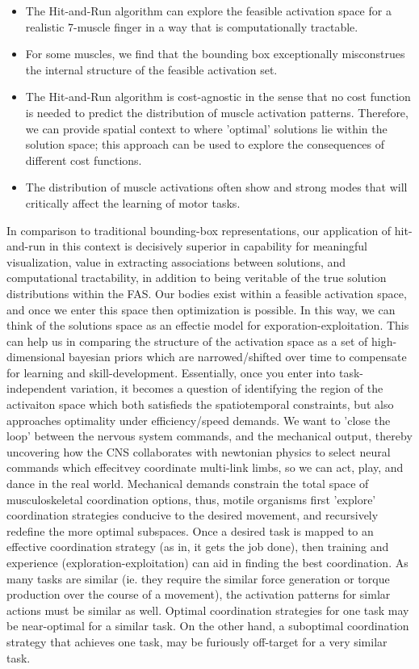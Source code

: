 \begin{itemize}
	\item{The Hit-and-Run algorithm can explore the feasible activation space for a realistic 7-muscle finger in a way that is computationally tractable.}
	\item{For some muscles, we find that the bounding box exceptionally misconstrues the internal structure of the feasible activation set.}
	\item{The Hit-and-Run algorithm is cost-agnostic in the sense that no cost function is needed to predict the distribution of muscle activation patterns. Therefore, we can provide spatial context to where 'optimal' solutions lie within the solution space; this approach can be used to explore the consequences of different cost functions.}
	\item{The distribution of muscle activations often show and strong modes that will critically affect the learning of motor tasks.}
\end{itemize}
In comparison to traditional bounding-box representations, our application of hit-and-run in this context is decisively superior in capability for meaningful visualization, value in extracting associations between solutions, and computational tractability, in addition to being veritable of the true solution distributions within the FAS. Our bodies exist within a feasible activation space, and once we enter this space then optimization is possible. In this way, we can think of the solutions space as an effectie model for exporation-exploitation.
This can help us in comparing the structure of the activation space as a set of high-dimensional bayesian priors which are narrowed/shifted over time to compensate for learning and skill-development.
Essentially, once you enter into task-independent variation, it becomes a question of identifying the region of the activaiton space which both satisfieds the spatiotemporal constraints, but also approaches optimality under efficiency/speed demands.
We want to 'close the loop' between the nervous system commands, and the mechanical output, thereby uncovering how the CNS collaborates with newtonian physics to select neural commands which effecitvey coordinate multi-link limbs, so we can act, play, and dance in the real world.
Mechanical demands constrain the total space of musculoskeletal coordination options, thus, motile organisms first 'explore' coordination strategies conducive to the desired movement, and recursively redefine the more optimal subspaces.
Once a desired task is mapped to an effective coordination strategy (as in, it gets the job done), then training and experience (exploration-exploitation) can aid in finding the best coordination.
As many tasks are similar (ie. they require the similar force generation or torque production over the course of a movement),  the activation patterns for simlar actions must be similar as well.
Optimal coordination strategies for one task may be near-optimal for a similar task.
On the other hand, a suboptimal coordination strategy that achieves one task, may be furiously off-target for a very similar task.

